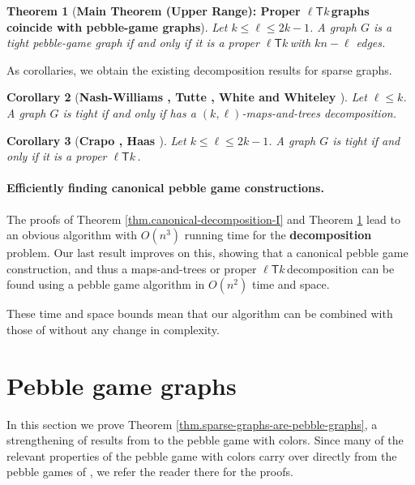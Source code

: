 \documentclass[Svgc,nospthms]{Svgc}
\newcommand{\ellteekay}{\ensuremath{\ell{\mathsf T}k}\,}
\newtheorem{theorem}{Theorem}
\newtheorem{corollary}[theorem]{Corollary}
\newcommand{\refthm}[1]{Theorem \ref{thm.#1}}
\newcommand{\labelthm}[1]{\label{thm.#1}}
\newcommand{\labelcor}[1]{\label{cor.#1}}
\begin{document}
\begin{theorem}[{\bf Main Theorem (Upper Range): Proper \ellteekay graphs coincide with pebble-game graphs}]
	Let $k\le \ell\le 2k-1$. A graph $G$ is a tight pebble-game graph if and only if it is a proper \ellteekay with $kn-\ell$ edges. \labelthm{canonical-decomposition-II} 
\end{theorem}
	
As corollaries, we obtain the existing decomposition results for sparse graphs.
\begin{corollary}
	[\textbf{Nash-Williams \cite{nash-williams:decomposition-into-forests:1964}, Tutte \cite{tutte:decomposing-graph-in-factors-1961}, White and Whiteley \cite{whiteley:union-matroids}}] 
		\labelcor{m-a-t-equals-tight}
	Let $\ell\le k$. A graph $G$ is tight if and only if has a $(k,\ell)$-maps-and-trees decomposition. 
\end{corollary}

\begin{corollary}
	[\textbf{Crapo \cite{crapo:rigidity:88}, Haas \cite{haas:2002}}] 
	\labelcor{t-a-t-equals-tight}
	Let $k\le \ell\le 2k-1$. A graph $G$ is tight if and only if it is a proper \ellteekay. 
\end{corollary}

	
\paragraph{Efficiently finding canonical pebble game constructions.}
The proofs of \refthm{canonical-decomposition-I} and \refthm{canonical-decomposition-II}
lead to an obvious algorithm with $O(n^3)$ running time for the {\bf decomposition}
problem.  Our last result improves on this, showing that a canonical pebble game 
construction, and thus a maps-and-trees or proper \ellteekay decomposition can be 
found using a pebble game algorithm in $O(n^2)$ time and space.

These time and space bounds mean that our algorithm can be 
combined with those of \cite{pebblegame} without any change in complexity.

	
\section{Pebble game  graphs} 
In this section we prove \refthm{sparse-graphs-are-pebble-graphs},
 a strengthening of results from \cite{pebblegame} to the pebble game with colors.
Since many of the relevant properties of the pebble game with colors carry over
directly from the pebble games of \cite{pebblegame}, we refer the reader there for the proofs.
\end{document}
